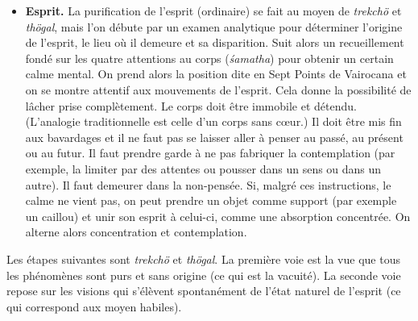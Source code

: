 \documentclass[11pt,a4paper]{article}
\begin{document}
\begin{itemize}
\begin{itemize}
      \item \textbf{Mouvement.} On se visualise sous la forme d'une
      syllabe \textsf{hung} blanche brillante de la taille d'une
      coudée. En prononçant lentement la syllabe, celle\hyp{}ci se met
      à s'élever au\hyp{}dessus du sol et à se mouvoir. Elle se rend
      d'abord dans des lieux familiers, de plus en plus lointains,
      sans rencontrer d'obstacles. Cet exercice purifie les habitudes
      (liées au mouvements du corps). On imagine ensuite que la
      syllabe se rend dans les Six Royaumes. Cela purifie les causes
      de renaissances dans ces lieux.\footnote{Et aussi la peur de
      renaître dans les royaumes inférieur et l'espoir de renaître
      dans les royaumes supérieurs?} La syllabe vole partout et tous
      les objets perçus en chemin deviennent radieux. Les Terres Pures
      sont aussi visitées et l'on imagine que l'on y reçoit les
      bénédictions des Éveillés primordiaux correspondant (le
      \emph{ma\d{n}\d{d}ala} des Cinq Familles est épuisé dans le sens
      horaire). Les objets de ces terres sont eux aussi purifé par le
      rayonnement intense de la syllabe sous la forme de laquelle l'on
      se visualise. Finalement, l'on rencontre Samantabhadra qui donne
      sa bénédiction à son tour.

    \end{itemize}

  \item \textbf{Esprit.} La purification de l'esprit (ordinaire) se
    fait au moyen de \emph{trekchö} et \emph{thögal}, mais l'on débute
    par un examen analytique pour déterminer l'origine de l'esprit, le
    lieu où il demeure et sa disparition. Suit alors un recueillement
    fondé sur les quatre attentions au corps (\emph{\'samatha}) pour
    obtenir un certain calme mental. On prend alors la position dite
    en Sept Points de Vairocana et on se montre attentif aux
    mouvements de l'esprit. Cela donne la possibilité de lâcher prise
    complètement. Le corps doit être immobile et détendu. (L'analogie
    traditionnelle est celle d'un corps sans c{\oe}ur.) Il doit être
    mis fin aux bavardages et il ne faut pas se laisser aller à penser
    au passé, au présent ou au futur. Il faut prendre garde à ne pas
    fabriquer la contemplation (par exemple, la limiter par des
    attentes ou pousser dans un sens ou dans un autre). Il faut
    demeurer dans la non\hyp{}pensée. Si, malgré ces instructions, le
    calme ne vient pas, on peut prendre un objet comme support (par
    exemple un caillou) et unir son esprit à celui\hyp{}ci, comme une
    absorption concentrée. On alterne alors concentration et
    contemplation.

\end{itemize}
Les étapes suivantes sont \emph{trekchö} et \emph{thögal}. La première
voie est la vue que tous les phénomènes sont purs et sans origine (ce
qui est la vacuité). La seconde voie repose sur les visions qui
s'élèvent spontanément de l'état naturel de l'esprit (ce qui
correspond aux moyen habiles).
\end{document}
